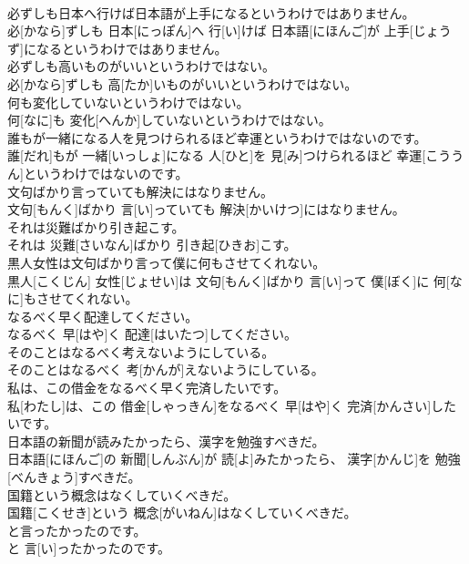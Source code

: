 \documentclass[8pt]{extreport}
\begin{document}
\begin{CJK}{UTF8}{min}
\\	必ずしも日本へ行けば日本語が上手になるというわけではありません。	
\\	必[かなら]ずしも 日本[にっぽん]へ 行[い]けば 日本語[にほんご]が 上手[じょうず]になるというわけではありません。	
\\	必ずしも高いものがいいというわけではない。	
\\	必[かなら]ずしも 高[たか]いものがいいというわけではない。	
\\	何も変化していないというわけではない。	
\\	何[なに]も 変化[へんか]していないというわけではない。	
\\	誰もが一緒になる人を見つけられるほど幸運というわけではないのです。	
\\	誰[だれ]もが 一緒[いっしょ]になる 人[ひと]を 見[み]つけられるほど 幸運[こううん]というわけではないのです。	
\\	文句ばかり言っていても解決にはなりません。	
\\	文句[もんく]ばかり 言[い]っていても 解決[かいけつ]にはなりません。	
\\	それは災難ばかり引き起こす。	
\\	それは 災難[さいなん]ばかり 引き起[ひきお]こす。	
\\	黒人女性は文句ばかり言って僕に何もさせてくれない。	
\\	黒人[こくじん] 女性[じょせい]は 文句[もんく]ばかり 言[い]って 僕[ぼく]に 何[なに]もさせてくれない。	
\\	なるべく早く配達してください。	
\\	なるべく 早[はや]く 配達[はいたつ]してください。	
\\	そのことはなるべく考えないようにしている。	
\\	そのことはなるべく 考[かんが]えないようにしている。	
\\	私は、この借金をなるべく早く完済したいです。	
\\	私[わたし]は、この 借金[しゃっきん]をなるべく 早[はや]く 完済[かんさい]したいです。	
\\	日本語の新聞が読みたかったら、漢字を勉強すべきだ。	
\\	日本語[にほんご]の 新聞[しんぶん]が 読[よ]みたかったら、 漢字[かんじ]を 勉強[べんきょう]すべきだ。	
\\	国籍という概念はなくしていくべきだ。	
\\	国籍[こくせき]という 概念[がいねん]はなくしていくべきだ。	
\\	と言ったかったのです。	
\\	と 言[い]ったかったのです。	

\end{CJK}
\end{document}

